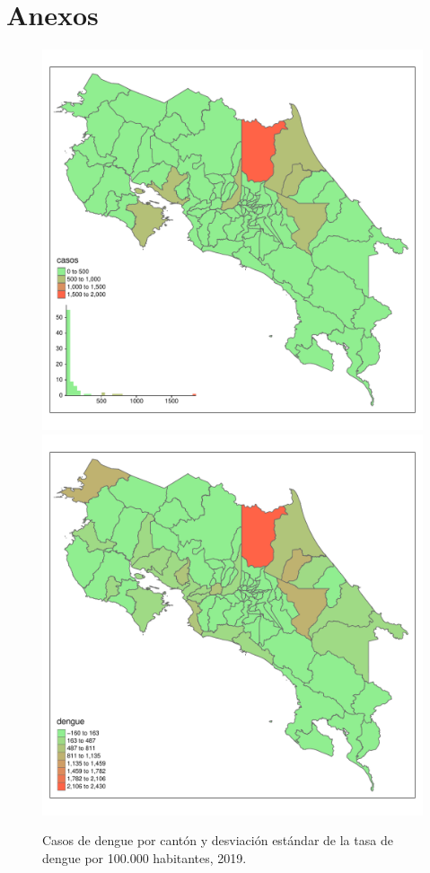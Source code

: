 \documentclass[12pt,a4paper]{article}
\begin{document}
\section{Anexos}

\begin{figure}[hbtp]
\centering
\includegraphics[width=.48\textwidth]{FA1.pdf}
\includegraphics[width=.48\textwidth]{FA2.pdf}
\caption{Casos de dengue por cantón y desviación estándar de la tasa de dengue por 100.000 habitantes, 2019.}
\end{figure}
\newpage
\end{document}
